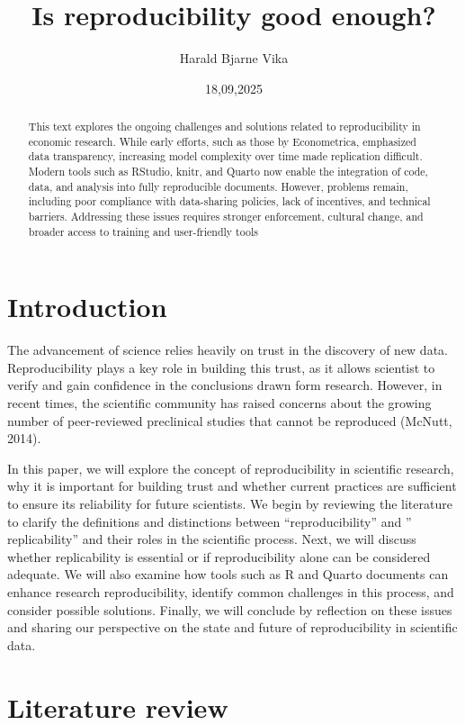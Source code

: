 \documentclass[
  a4paper,
]{article}
\title{Is reproducibility good enough?}
\author{Harald Bjarne Vika}
\date{18,09,2025}
\begin{document}
\maketitle
\begin{abstract}
This text explores the ongoing challenges and solutions related to
reproducibility in economic research. While early efforts, such as those
by Econometrica, emphasized data transparency, increasing model
complexity over time made replication difficult. Modern tools such as
RStudio, knitr, and Quarto now enable the integration of code, data, and
analysis into fully reproducible documents. However, problems remain,
including poor compliance with data-sharing policies, lack of
incentives, and technical barriers. Addressing these issues requires
stronger enforcement, cultural change, and broader access to training
and user-friendly tools
\end{abstract}


\section{Introduction}\label{introduction}

The advancement of science relies heavily on trust in the discovery of
new data. Reproducibility plays a key role in building this trust, as it
allows scientist to verify and gain confidence in the conclusions drawn
form research. However, in recent times, the scientific community has
raised concerns about the growing number of peer-reviewed preclinical
studies that cannot be reproduced (McNutt, 2014).

In this paper, we will explore the concept of reproducibility in
scientific research, why it is important for building trust and whether
current practices are sufficient to ensure its reliability for future
scientists. We begin by reviewing the literature to clarify the
definitions and distinctions between ``reproducibility'' and ''
replicability'' and their roles in the scientific process. Next, we will
discuss whether replicability is essential or if reproducibility alone
can be considered adequate. We will also examine how tools such as R and
Quarto documents can enhance research reproducibility, identify common
challenges in this process, and consider possible solutions. Finally, we
will conclude by reflection on these issues and sharing our perspective
on the state and future of reproducibility in scientific data.

\section{Literature review}\label{literature-review}
\end{document}

